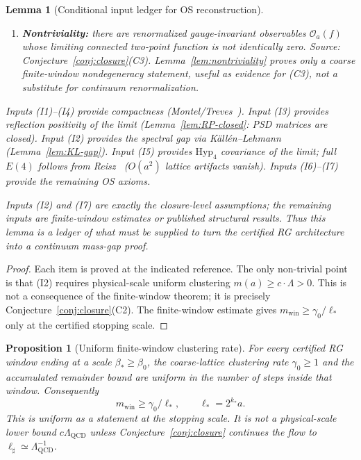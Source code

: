 \documentclass[11pt]{article}
\newtheorem{lemma}[theorem]{Lemma}
\newtheorem{proposition}[theorem]{Proposition}
\theoremstyle{definition}
\newcommand{\Lam}{\Lambda_{\mathrm{QCD}}}
\begin{document}
\begin{lemma}[Conditional input ledger for OS reconstruction]
\begin{enumerate}[nosep,label=\textup{(I\arabic*)}]
\item \textbf{Nontriviality:}
there are renormalized gauge-invariant observables
$\mathcal O_a(f)$ whose limiting connected two-point function is not
identically zero.
\emph{Source:} Conjecture~\ref{conj:closure}(C3).  Lemma~\ref{lem:nontriviality}
proves only a coarse finite-window nondegeneracy statement, useful as
evidence for (C3), not a substitute for continuum renormalization.
\end{enumerate}
Inputs (I1)--(I4) provide compactness
\textup{(}Montel/Treves~\cite{Treves}\textup{)}.
Input (I3) provides reflection positivity of the limit
\textup{(}Lemma~\ref{lem:RP-closed}: PSD matrices are closed\textup{)}.
Input (I2) provides the spectral gap via
K\"all\'en--Lehmann \textup{(}Lemma~\ref{lem:KL-gap}\textup{)}.
Input (I5) provides $\mathrm{Hyp}_4$ covariance of the limit;
full $E(4)$ follows from Reisz~\cite{Reisz1988}
\textup{(}$O(a^2)$ lattice artifacts vanish\textup{)}.
Inputs (I6)--(I7) provide the remaining OS axioms.

Inputs (I2) and (I7) are exactly the closure-level assumptions; the
remaining inputs are finite-window estimates or published structural
results.  Thus this lemma is a ledger of what must be supplied to turn
the certified RG architecture into a continuum mass-gap proof.
\end{lemma}

\begin{proof}
Each item is proved at the indicated reference.  The only non-trivial point is that (I2) requires physical-scale
uniform clustering $m(a)\ge c\cdot\Lambda>0$.  This is not a
consequence of the finite-window theorem; it is precisely
Conjecture~\ref{conj:closure}(C2).  The finite-window estimate gives
$m_{\mathrm{win}}\ge\gamma_0/\ell_*$ only at the certified stopping
scale.
\end{proof}


\begin{proposition}[Uniform finite-window clustering rate]%
\label{prop:clustering-uniform}
For every certified RG window ending at a scale $\beta_*\ge\beta_0$,
the coarse-lattice clustering rate $\gamma_0\ge1$ and the accumulated
remainder bound are uniform in the number of steps inside that window.
Consequently
\[
 m_{\mathrm{win}}\ge \gamma_0/\ell_*,\qquad \ell_*=2^{k_*}a.
\]
This is uniform as a statement at the stopping scale.  It is not a
physical-scale lower bound $c\Lam$ unless Conjecture~\ref{conj:closure}
continues the flow to $\ell_\sharp\simeq\Lam^{-1}$.
\end{proposition}
\end{document}
